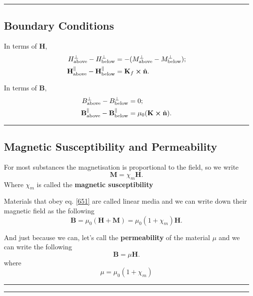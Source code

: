 \documentclass[12pt,english]{article}
\numberwithin{equation}{subsection}
\let\oldhat\hat
\renewcommand{\vec}[1]{\mathbf{#1}}
\renewcommand{\hat}[1]{\oldhat{\mathbf{#1}}}
\begin{document}
\par\noindent\rule{\textwidth}{0.4pt}
\subsection{Boundary Conditions}
In terms of $\vec{H}$,
\begin{align}
    H_{\text{above}}^{\bot} - H_{\text{below}}^{\bot} &= -(M_{\text{above}}^{\bot}-M_{\text{below}}^{\bot});\\
    \vec{H}_{\text{above}}^{\parallel} - \vec{H}_{\text{below}}^{\parallel} &= \vec{K}_f \cross \hat{n}.
\end{align}

In terms of $\vec{B}$,
\begin{align}
    B_{\text{above}}^{\bot} - B_{\text{below}}^{\bot} &= 0;\\
    \vec{B}_{\text{above}}^{\parallel} - \vec{B}_{\text{below}}^{\parallel} &= \mu_0(\vec{K}\cross \hat{n}).
\end{align}

\par\noindent\rule{\textwidth}{0.4pt}
\subsection{Magnetic Susceptibility and Permeability}
For most substances the magnetisation is proportional to the field, so we write
\begin{equation}
    \vec{M} = \chi_m \vec{H}.\label{651}
\end{equation}
Where $\chi_m$ is called the \textbf{magnetic susceptibility}

Materials that obey eq. \ref{651} are called linear media and we can write down their magnetic field as the following
\begin{equation}
    \vec{B} = \mu_0(\vec{H} + \vec{M}) = \mu_0(1+\chi_m)\vec{H}.
\end{equation}

And just because we can, let's call the \textbf{permeability} of the material $\mu$ and we can write the following
\begin{equation}
    \vec{B} = \mu \vec{H}.
\end{equation}
where 
\begin{equation}
    \mu = \mu_0(1+\chi_m)
\end{equation}
\par\noindent\rule{\textwidth}{0.4pt}
\par\noindent\rule{\textwidth}{0.4pt}
\end{document}
